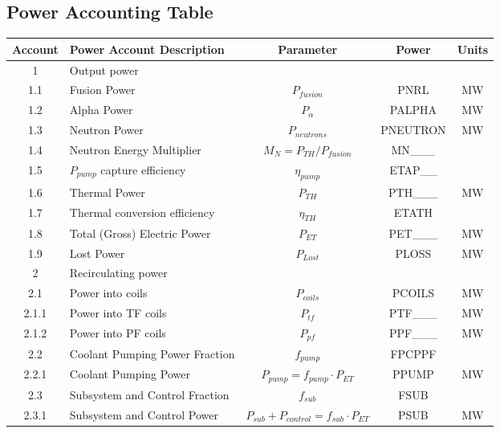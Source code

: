 \newpage
\subsection{Power Accounting Table}

\begin{table}[ht!]								
\centering								
\begin{tabular}{|c|p{5cm}|c|c|c|}								
\hline								
\textbf{Account}	&	\textbf{Power Account Description}	&	\textbf{Parameter }	&	\textbf{Power}	&	\textbf{Units} \\
\hline								
1	&	Output power	&		&		&	\\
\hline
1.1	&	Fusion Power	&	$P_{{fusion}}$	&	PNRL	&	MW \\
1.2	&	Alpha Power	&	$P_{{\alpha}}$	&	PALPHA	&	MW \\
1.3	&	Neutron Power	&	$P_{{neutrons}}$	&	PNEUTRON	&	MW \\
1.4	&	Neutron Energy Multiplier	&	$M_N = P_{{TH}}/P_{{fusion}}$	&	MN___	&	\\
1.5	&	$P_{pump}$ capture efficiency	&	$\eta_{{pump}}$	&	ETAP__	&	\\
1.6	&	Thermal Power	&	$P_{{TH}}$	&	PTH___	&	MW \\
1.7	&	Thermal conversion efficiency	&	$\eta_{{TH}}$	&	ETATH	&	\\
1.8	&	Total (Gross) Electric Power	&	$P_{{ET}}$	&	PET___	&	MW \\
1.9	&	Lost Power	&	$P_{{Lost}}$	&	PLOSS	&	MW \\
\hline								
2	&	Recirculating power	&		&		&	\\
\hline
2.1	&	Power into coils 	&	$P_{coils}$ &	PCOILS	&	MW \\
2.1.1	&	Power into TF coils	&	$P_{tf}$	&	PTF___	&	MW \\
2.1.2	&	Power into PF coils	&	$P_{pf}$	&	PPF___		&	MW \\
2.2	&	Coolant Pumping Power Fraction	&	$f_{{pump}}$	&	FPCPPF &	\\
2.2.1	&	Coolant Pumping Power	&	$P_{{pump}} = f_{{pump}} \cdot P_{{ET}}$	&	PPUMP	&	MW \\
2.3	&	Subsystem and Control Fraction	&	$f_{{sub}}$	&	FSUB	&	\\
2.3.1	&	Subsystem and Control Power	&	$P_{{sub}} + P_{{control}} = f_{{sub}} \cdot P_{{ET}}$	&	PSUB	&	MW \\

\end{tabular}
\end{table}
